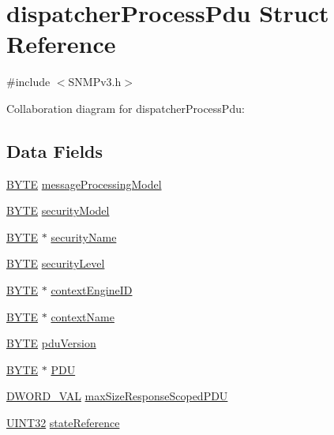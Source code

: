 \hypertarget{structdispatcher_process_pdu}{}\section{dispatcher\+Process\+Pdu Struct Reference}
\label{structdispatcher_process_pdu}


{\ttfamily \#include $<$S\+N\+M\+Pv3.\+h$>$}



Collaboration diagram for dispatcher\+Process\+Pdu\+:
\subsection*{Data Fields}
\begin{DoxyCompactItemize}
\item 
\hyperlink{_generic_type_defs_8h_a4ae1dab0fb4b072a66584546209e7d58}{B\+Y\+T\+E} \hyperlink{structdispatcher_process_pdu_a47f1a1b8f7a3fe5623fe37df094ac032}{message\+Processing\+Model}
\item 
\hyperlink{_generic_type_defs_8h_a4ae1dab0fb4b072a66584546209e7d58}{B\+Y\+T\+E} \hyperlink{structdispatcher_process_pdu_ac19ed44216346e9d6c50819813db6867}{security\+Model}
\item 
\hyperlink{_generic_type_defs_8h_a4ae1dab0fb4b072a66584546209e7d58}{B\+Y\+T\+E} $\ast$ \hyperlink{structdispatcher_process_pdu_a4a48a8746988a1f761c3e9eadcc20463}{security\+Name}
\item 
\hyperlink{_generic_type_defs_8h_a4ae1dab0fb4b072a66584546209e7d58}{B\+Y\+T\+E} \hyperlink{structdispatcher_process_pdu_a9314d7b462ce4cc59202ed48fcdd9945}{security\+Level}
\item 
\hyperlink{_generic_type_defs_8h_a4ae1dab0fb4b072a66584546209e7d58}{B\+Y\+T\+E} $\ast$ \hyperlink{structdispatcher_process_pdu_aa75baf2d001f5d5ac415eed279fd6e85}{context\+Engine\+I\+D}
\item 
\hyperlink{_generic_type_defs_8h_a4ae1dab0fb4b072a66584546209e7d58}{B\+Y\+T\+E} $\ast$ \hyperlink{structdispatcher_process_pdu_af55ce5882ccbc8435fb33f1020c74550}{context\+Name}
\item 
\hyperlink{_generic_type_defs_8h_a4ae1dab0fb4b072a66584546209e7d58}{B\+Y\+T\+E} \hyperlink{structdispatcher_process_pdu_a731491a51ee1a2971e5cd7d7446c1dab}{pdu\+Version}
\item 
\hyperlink{_generic_type_defs_8h_a4ae1dab0fb4b072a66584546209e7d58}{B\+Y\+T\+E} $\ast$ \hyperlink{structdispatcher_process_pdu_abf0d7b0afb4ebcedb2a0138c9b14fdb5}{P\+D\+U}
\item 
\hyperlink{union_d_w_o_r_d___v_a_l}{D\+W\+O\+R\+D\+\_\+\+V\+A\+L} \hyperlink{structdispatcher_process_pdu_aefdab5fab337456692dd4eafbbf61c1a}{max\+Size\+Response\+Scoped\+P\+D\+U}
\item 
\hyperlink{_generic_type_defs_8h_a1720f33f59b583f0c2ed071815623a86}{U\+I\+N\+T32} \hyperlink{structdispatcher_process_pdu_a62eef1407cf307242b77d068071cafeb}{state\+Reference}
\end{DoxyCompactItemize}


